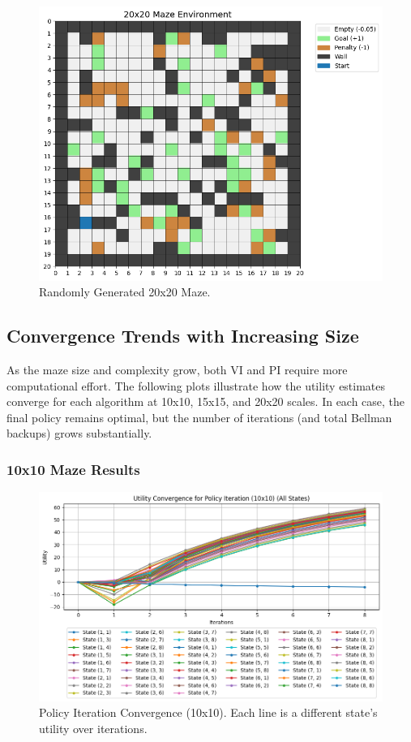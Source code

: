 \documentclass[11pt]{article}
\begin{document}
\begin{figure}[H]
    \centering
    \includegraphics[width=\textwidth]{maze_20x20_environment.png}
    \caption{Randomly Generated 20x20 Maze.}
    \label{fig:maze20x20}
\end{figure}

\subsection{Convergence Trends with Increasing Size}
As the maze size and complexity grow, both VI and PI require more computational effort. The following plots illustrate how the utility estimates converge for each algorithm at 10x10, 15x15, and 20x20 scales. In each case, the final policy remains optimal, but the number of iterations (and total Bellman backups) grows substantially.

\subsubsection{10x10 Maze Results}
\begin{figure}[H]
    \centering
    \includegraphics[width=\textwidth]{10x10_policy_iteration_convergence.png}
    \caption{Policy Iteration Convergence (10x10). Each line is a different state's utility over iterations.}
    \label{fig:10x10_pi_conv}
\end{figure}
\end{document}

